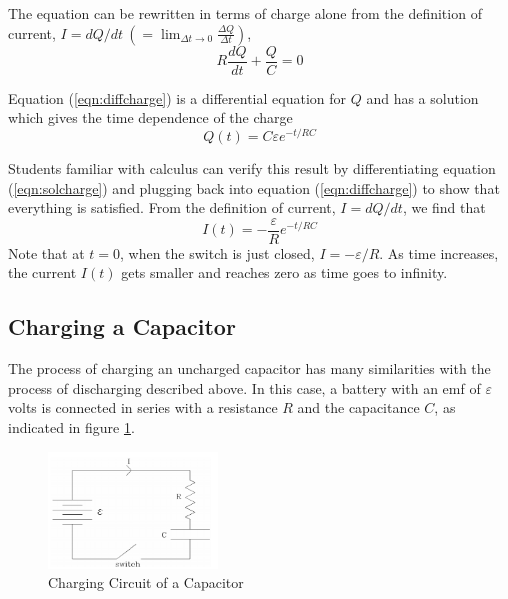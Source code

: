 The equation can be rewritten in terms of charge alone from the definition of current, $\displaystyle I = dQ/dt \ \left(=\lim_{\Delta t\to 0} \frac{\Delta Q}{\Delta t}\right)$,
\begin{equation}
    R\frac{dQ}{dt} + \frac{Q}{C} = 0
    \label{eqn:diffcharge}
\end{equation}

Equation (\ref{eqn:diffcharge}) is a differential equation for $Q$ and has a solution which gives the time dependence of the charge
\begin{equation}
    Q(t) = C\varepsilon e^{-t/RC}
    \label{eqn:solcharge}
\end{equation}

Students familiar with calculus can verify this result by differentiating equation (\ref{eqn:solcharge}) and plugging back into equation (\ref{eqn:diffcharge}) to show that everything is satisfied. From the definition of current, $I = dQ/dt$, we find that
\begin{equation}
    I(t) = -\frac{\varepsilon}{R}e^{-t/RC}
    \label{eqn:dischargecurrent}
\end{equation}
Note that at $t=0$, when the switch is just closed, $I = -\varepsilon/R$. As time increases, the current $I(t)$ gets smaller and reaches zero as time goes to infinity.

\subsection{Charging a Capacitor}

The process of charging an uncharged capacitor has many similarities with the process of discharging described above. In this case, a battery with an emf of $\varepsilon$ volts is connected in series with a resistance $R$ and the capacitance $C$, as indicated in figure \ref{fig:chargecircuit}.

\begin{figure}[h]
    \begin{center}
        \includegraphics[width=0.4\textwidth]{./Exp3/pic/image3.png}
    \end{center}
    \caption{Charging Circuit of a Capacitor}
    \label{fig:chargecircuit}
\end{figure}


